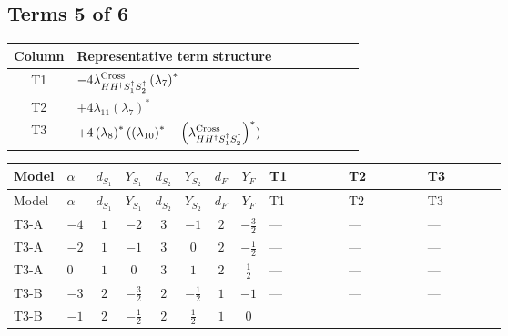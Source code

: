 \documentclass[8pt]{article}
\begin{document}
\begin{landscape}
\subsection*{Terms 5 of 6}
\begin{center}
\begin{tabular}{@{}c >{\raggedright\arraybackslash}p{0.82\linewidth}@{}}
\toprule
Column & Representative term structure \\
\midrule
T1 & \(\displaystyle -4 {\lambda_{H H^\dagger S_1^\dagger S_2^\dagger}^{\rm Cross}} \left({\lambda_{7}}\right)^{*}\) \\
\midrule
T2 & \(\displaystyle +4 {\lambda_{11}} \left({\lambda_{7}}\right)^{*}\) \\
\midrule
T3 & \(\displaystyle +4 \left({\lambda_{8}}\right)^{*} (\left({\lambda_{10}}\right)^{*}-\left({\lambda_{H H^\dagger S_1^\dagger S_2^\dagger}^{\rm Cross}}\right)^{*})\) \\
\midrule
\bottomrule
\end{tabular}
\end{center}
\smallskip
\tiny
\begin{longtable}{@{}llcccccc >{\raggedright\arraybackslash}p{0.21\linewidth} >{\raggedright\arraybackslash}p{0.21\linewidth} >{\raggedright\arraybackslash}p{0.21\linewidth}@{}}
\toprule
Model & $\alpha$ & $d_{S_1}$ & $Y_{S_1}$ & $d_{S_2}$ & $Y_{S_2}$ & $d_F$ & $Y_F$ & T1 & T2 & T3 \\
\midrule
\endfirsthead
\toprule
Model & $\alpha$ & $d_{S_1}$ & $Y_{S_1}$ & $d_{S_2}$ & $Y_{S_2}$ & $d_F$ & $Y_F$ & T1 & T2 & T3 \\
\midrule
\endhead
T3-A & $-4$ & $1$ & $-2$ & $3$ & $-1$ & $2$ & $-\frac{3}{2}$ & --- & --- & --- \\
\midrule
T3-A & $-2$ & $1$ & $-1$ & $3$ & $0$ & $2$ & $-\frac{1}{2}$ & --- & --- & --- \\
\midrule
T3-A & $0$ & $1$ & $0$ & $3$ & $1$ & $2$ & $\frac{1}{2}$ & --- & --- & --- \\
\midrule
T3-B & $-3$ & $2$ & $-\frac{3}{2}$ & $2$ & $-\frac{1}{2}$ & $1$ & $-1$ & --- & --- & --- \\
\midrule
T3-B & $-1$ & $2$ & $-\frac{1}{2}$ & $2$ & $\frac{1}{2}$ & $1$ & $0$ & \scriptsize\adjustbox{max width=\linewidth}{$\begin{gathered} -4 {\lambda_{H H^\dagger S_1^\dagger S_2^\dagger}^{\rm Cross}} \left({\lambda_{7}}\right)^{*}\end{gathered}$} & \scriptsize\adjustbox{max width=\linewidth}{$\begin{gathered} +4 {\lambda_{11}} \left({\lambda_{7}}\right)^{*}\end{gathered}$} & \scriptsize\adjustbox{max width=\linewidth}{$\begin{gathered} +4 \left({\lambda_{8}}\right)^{*} (\left({\lambda_{10}}\right)^{*}-\left({\lambda_{H H^\dagger S_1^\dagger S_2^\dagger}^{\rm Cross}}\right)^{*})\end{gathered}$} \\

\end{longtable}
\end{landscape}
\end{document}
